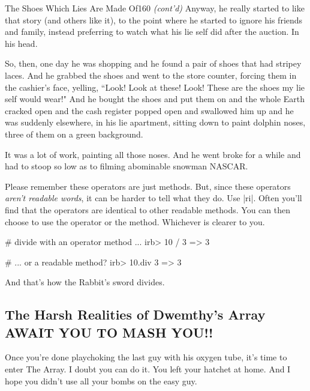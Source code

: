 \documentclass[12pt,twoside]{report}
\begin{document}
	\begin{sidebar}{The Shoes Which Lies Are Made Of}{160}
		\textit{(cont'd)} Anyway, he really started to like that story (and others like it), to the point where he started to ignore his friends and family, instead preferring to watch what his lie self did after the auction. In his head.\vspace{6pt}
		
		So, then, one day he was shopping and he found a pair of shoes that had stripey laces. And he grabbed the shoes and went to the store counter, forcing them in the cashier's face, yelling, ``Look! Look at these! Look! These are the shoes my lie self would wear!" And he bought the shoes and put them on and the whole Earth cracked open and the cash register popped open and swallowed him up and he was suddenly elsewhere, in his lie apartment, sitting down to paint dolphin noses, three of them on a green background.\vspace{6pt}

		It was a lot of work, painting all those noses. And he went broke for a while and had to stoop so low as to filming abominable snowman NASCAR.
	\end{sidebar}

Please remember these operators are just methods.  But, since these
operators {\em aren't readable words}, it can be harder to tell what
they do.  Use \rubyinline|ri|.  Often you'll find that
the operators are identical to other readable methods.  You can then
choose to use the operator or the method. Whichever is clearer to you.


\begin{consolecode}

 # divide with an operator method ...
 irb> 10 / 3
   => 3

 # ... or a readable method?
 irb> 10.div 3
   => 3

\end{consolecode}


And that's how the Rabbit's sword divides.



\subsection{The Harsh Realities of Dwemthy's Array AWAIT YOU TO MASH YOU!!}



Once you're done playchoking the last guy with his oxygen tube, it's
time to enter The Array.  I doubt you can do it.  You left your
hatchet at home.  And I hope you didn't use all your bombs on the easy
guy.
\end{document}
